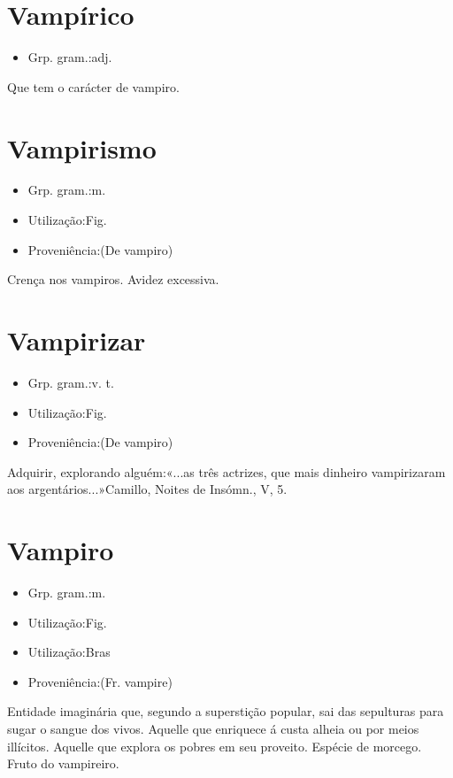 \documentclass{article}
\begin{document}
\section{Vampírico}
\begin{itemize}
\item {Grp. gram.:adj.}
\end{itemize}
Que tem o carácter de vampiro.
\section{Vampirismo}
\begin{itemize}
\item {Grp. gram.:m.}
\end{itemize}
\begin{itemize}
\item {Utilização:Fig.}
\end{itemize}
\begin{itemize}
\item {Proveniência:(De \textunderscore vampiro\textunderscore )}
\end{itemize}
Crença nos vampiros.
Avidez excessiva.
\section{Vampirizar}
\begin{itemize}
\item {Grp. gram.:v. t.}
\end{itemize}
\begin{itemize}
\item {Utilização:Fig.}
\end{itemize}
\begin{itemize}
\item {Proveniência:(De \textunderscore vampiro\textunderscore )}
\end{itemize}
Adquirir, explorando alguém:«\textunderscore ...as três actrizes, que mais dinheiro vampirizaram aos argentários...\textunderscore »Camillo, \textunderscore Noites de Insómn.\textunderscore , V, 5.
\section{Vampiro}
\begin{itemize}
\item {Grp. gram.:m.}
\end{itemize}
\begin{itemize}
\item {Utilização:Fig.}
\end{itemize}
\begin{itemize}
\item {Utilização:Bras}
\end{itemize}
\begin{itemize}
\item {Proveniência:(Fr. \textunderscore vampire\textunderscore )}
\end{itemize}
Entidade imaginária que, segundo a superstição popular, sai das sepulturas para sugar o sangue dos vivos.
Aquelle que enriquece á custa alheia ou por meios illícitos.
Aquelle que explora os pobres em seu proveito.
Espécie de morcego.
Fruto do vampireiro.
\end{document}
